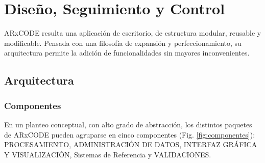 \chapter{Diseño, Seguimiento y Control}
\label{chap:diseño} 

ARxCODE resulta una aplicaci\'on de escritorio, de estructura modular, reusable y modificable. Pensada con una filosof\'ia de expansi\'on y perfeccionamiento, su arquitectura permite la adici\'on de funcionalidades sin mayores inconvenientes.\\

\section{Arquitectura}

\subsection*{Componentes}\label{subsec:componentes}
En un planteo conceptual, con alto grado de abstracci\'on, los distintos paquetes de ARxCODE pueden agruparse en cinco componentes (Fig.  \ref{fig:componentes}): PROCESAMIENTO, ADMINISTRACI\'ON DE DATOS, INTERFAZ GR\'AFICA Y VISUALIZACI\'ON, Sistemas de Referencia y VALIDACIONES.

